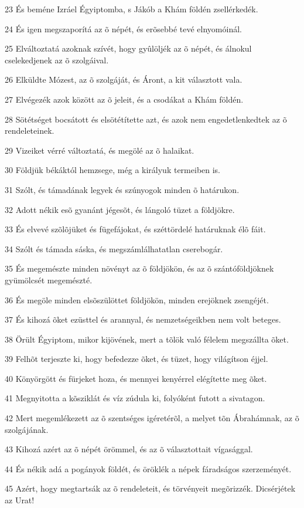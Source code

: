 \par 23 És beméne Izráel Égyiptomba, s Jákób a Khám földén zsellérkedék.
\par 24 És igen megszaporítá az õ népét, és erõsebbé tevé elnyomóinál.
\par 25 Elváltoztatá azoknak szívét, hogy gyûlöljék az õ népét, és álnokul cselekedjenek az õ szolgáival.
\par 26 Elküldte Mózest, az õ szolgáját, és Áront, a kit választott vala.
\par 27 Elvégezék azok között az õ jeleit, és a csodákat a Khám földén.
\par 28 Sötétséget bocsátott és elsötétítette azt, és azok nem engedetlenkedtek az õ rendeleteinek.
\par 29 Vizeiket vérré változtatá, és megölé az õ halaikat.
\par 30 Földjük békáktól hemzsege, még a királyuk termeiben is.
\par 31 Szólt, és támadának legyek és szúnyogok minden õ határukon.
\par 32 Adott nékik esõ gyanánt jégesõt, és lángoló tüzet a földjökre.
\par 33 És elvevé szõlõjüket és fügefájokat, és széttördelé határuknak élõ fáit.
\par 34 Szólt és támada sáska, és megszámlálhatatlan cserebogár.
\par 35 És megemészte minden növényt az õ földjökön, és az õ szántóföldjöknek gyümölcsét megemészté.
\par 36 És megöle minden elsõszülöttet földjökön, minden erejöknek zsengéjét.
\par 37 És kihozá õket ezüsttel és arannyal, és nemzetségeikben nem volt beteges.
\par 38 Örült Égyiptom, mikor kijövének, mert a tõlök való félelem megszállta õket.
\par 39 Felhõt terjeszte ki, hogy befedezze õket, és tüzet, hogy világítson éjjel.
\par 40 Könyörgött és fürjeket hoza, és mennyei kenyérrel elégítette meg õket.
\par 41 Megnyitotta a kõsziklát és víz zúdula ki, folyóként futott a sivatagon.
\par 42 Mert megemlékezett az õ szentséges igéretérõl, a melyet tõn Ábrahámnak, az õ szolgájának.
\par 43 Kihozá azért az õ népét örömmel, és az õ választottait vígasággal.
\par 44 És nékik adá a pogányok földét, és öröklék a népek fáradságos szerzeményét.
\par 45 Azért, hogy megtartsák az õ rendeleteit, és törvényeit megõrizzék. Dicsérjétek az Urat!

